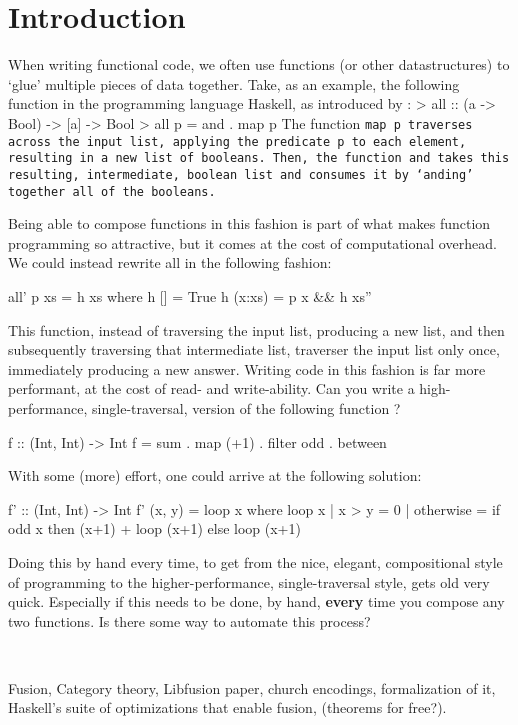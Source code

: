 
\section{Introduction}
When writing functional code, we often use functions (or other datastructures) to `glue' multiple pieces of data together.
Take, as an example, the following function in the programming language Haskell, as introduced by \cite{Gill1993}: %
>   all :: (a -> Bool) -> [a] -> Bool
>   all p = and . map p
The function \tt{map p} traverses across the input list, applying the predicate \tt{p} to each element, resulting in a new list of booleans. Then, the function \tt{and} takes this resulting, intermediate, boolean list and consumes it by `anding' together all of the booleans.

Being able to compose functions in this fashion is part of what makes function programming so attractive, but it comes at the cost of computational overhead. We could instead rewrite all in the following fashion:
\begin{code}
all' p xs = h xs
      where h []     = True
            h (x:xs) = p x && h xs''
\end{code}
This function, instead of traversing the input list, producing a new list, and then subsequently traversing that intermediate list, traverser the input list only once, immediately producing a new answer. Writing code in this fashion is far more performant, at the cost of read- and write-ability.
Can you write a high-performance, single-traversal, version of the following function \citep{Harper2011}?
\begin{code}
    f :: (Int, Int) -> Int
    f = sum . map (+1) . filter odd . between
\end{code}
With some (more) effort, one could arrive at the following solution:
\begin{code}
    f' :: (Int, Int) -> Int
    f' (x, y) = loop x
      where loop x | x > y     = 0
                   | otherwise = if odd x
                                 then (x+1) + loop (x+1)
                                 else loop (x+1)
\end{code}
Doing this by hand every time, to get from the nice, elegant, compositional style of programming to the higher-performance, single-traversal style, gets old very quick. Especially if this needs to be done, by hand, \textbf{every} time you compose any two functions.
Is there some way to automate this process?


~

Fusion, Category theory, Libfusion paper, church encodings, formalization of it, Haskell's suite of optimizations that enable fusion, (theorems for free?).


